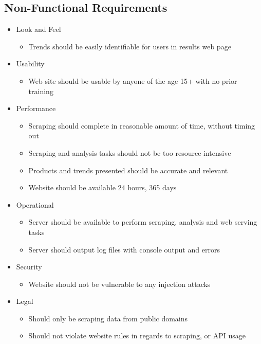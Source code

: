 \documentclass{article}
\begin{document}
	\subsection{Non-Functional Requirements}
		\begin{itemize}
			\item Look and Feel
				\begin{itemize}
					\item Trends should be easily identifiable for users in results web page
				\end{itemize}
			\item Usability 
				\begin{itemize}
					\item Web site should be usable by anyone of the age 15+ with no prior training
				\end{itemize}
			\item Performance
				\begin{itemize}
					\item Scraping should complete in reasonable amount of time, without timing out
					\item Scraping and analysis tasks should not be too resource-intensive
					\item Products and trends presented should be accurate and relevant
					\item Website should be available 24 hours, 365 days
				\end{itemize}
			\item Operational
				\begin{itemize}
					\item Server should be available to perform scraping, analysis and web serving tasks
					\item Server should output log files with console output and errors
				\end{itemize}
			\item Security
				\begin{itemize}
					\item Website should not be vulnerable to any injection attacks
				\end{itemize}
			\item Legal
				\begin{itemize}
					\item Should only be scraping data from public domains
					\item Should not violate website rules in regards to scraping, or API usage
				\end{itemize}
		\end{itemize}
\end{document}
